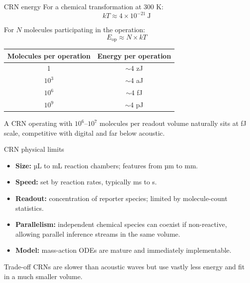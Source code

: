 \documentclass[aspectratio=169,11pt]{beamer}
\begin{document}
\begin{frame}{CRN energy}
  \small
  For a chemical transformation at 300 K:
  \[
    kT \approx 4 \times 10^{-21}\ \text{J}
  \]

  For $N$ molecules participating in the operation:
  \[
    E_{\text{op}} \approx N \times kT
  \]

  \begin{center}
    \footnotesize
    \begin{tabular}{cc}
      \toprule
      Molecules per operation & Energy per operation \\
      \midrule
      1 & $\sim$4 zJ \\
      $10^3$ & $\sim$4 aJ \\
      $10^6$ & $\sim$4 fJ \\
      $10^9$ & $\sim$4 pJ \\
      \bottomrule
    \end{tabular}
  \end{center}

  \vspace{0.2cm}
  A CRN operating with $10^6$--$10^7$ molecules per readout volume naturally sits at fJ scale, competitive with digital and far below acoustic.
\end{frame}

\begin{frame}{CRN physical limits}
  \small
  \begin{itemize}
    \item \textbf{Size:} µL to mL reaction chambers; features from µm to mm.
    \item \textbf{Speed:} set by reaction rates, typically ms to s.
    \item \textbf{Readout:} concentration of reporter species; limited by molecule-count statistics.
    \item \textbf{Parallelism:} independent chemical species can coexist if non-reactive, allowing parallel inference streams in the same volume.
    \item \textbf{Model:} mass-action ODEs are mature and immediately implementable.
  \end{itemize}

  \vspace{0.3cm}
  \begin{block}{Trade-off}
    CRNs are slower than acoustic waves but use vastly less energy and fit in a much smaller volume.
  \end{block}
\end{frame}
\end{document}
